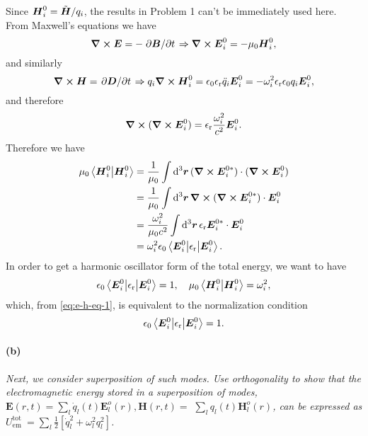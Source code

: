\documentclass[hyperref, a4paper]{article}
\newcommand{\epsr}{\epsilon_{\text{r}}}
\newcommand*{\mvb}[1]{\tilde{\vb*{#1}}}
\begin{document}
Since $\vb*{H}_i^0 = \mvb{H} / q_i$, the results in Problem 1 can't be immediately used here. 
From Maxwell's equations we have 
\[
    \curl{\vb*{E}} = - \pdv*{\vb*{B}}{t} \Rightarrow 
    \curl{\vb*{E}_i^0} = - \mu_0 \vb*{H}_i^0, 
\]
and similarly 
\[
    \curl{\vb*{H}} = \pdv*{\vb*{D}}{t} \Rightarrow
    q_i \curl{\vb*{H}_i^0} = \epsilon_0 \epsr \ddot{q}_i \vb*{E}_i^0 
    = - \omega_i^2 \epsr \epsilon_0 q_i \vb*{E}_i^0,
\]
and therefore 
\[
    \curl{(\curl{\vb*{E}_i^0})} = \epsr \frac{\omega_i^2}{c^2} \vb*{E}_i^0.
\]
Therefore we have 
\begin{equation}
    \begin{aligned}
        \mu_0 \braket{\vb*{H}_i^0}{\vb*{H}_i^0} 
        &= \frac{1}{\mu_0} \int \dd[3]{\vb*{r}} (\curl{\vb*{E}_i^{0*}}) \cdot (\curl{\vb*{E}_i^0}) \\
        &= \frac{1}{\mu_0} \int \dd[3]{\vb*{r}} \curl{(\curl{\vb*{E}_i^{0*}})} \cdot \vb*{E}_i^0 \\
        &= \frac{\omega_i^2}{\mu_0 c^2} \int \dd[3]{\vb*{r}} \epsr \vb*{E}_i^{0*} \cdot \vb*{E}_i^0 \\
        &= \omega_i^2 \epsilon_0 \mel**{\vb*{E}_i^0}{\epsr}{\vb*{E}_i^0}.
    \end{aligned}
    \label{eq:e-h-eq-1}
\end{equation}
In order to get a harmonic oscillator form of the total energy, 
we want to have 
\begin{equation}
    \epsilon_0 \mel**{\vb*{E}_i^0}{\epsr}{\vb*{E}_i^0} = 1, \quad 
    \mu_0 \braket{\vb*{H}_i^0}{\vb*{H}_i^0} = \omega_i^2, 
\end{equation}
which, from \eqref{eq:e-h-eq-1}, is equivalent to the normalization condition 
\begin{equation}
    \epsilon_0 \mel**{\vb*{E}_i^0}{\epsr}{\vb*{E}_i^0} = 1.
\end{equation} 

\paragraph*{(b)} \textit{Next, we consider superposition of such modes. Use orthogonality to show that the electromagnetic energy stored in a superposition of modes, $\mathbf{E}(r, t)=\sum_l \dot{q}_l(t) \mathbf{E}_l^o(r), \mathbf{H}(r, t)=$ $\sum_l q_l(t) \mathbf{H}_l^o(r)$, can be expressed as $U_{\text {em }}^{\text {tot }}=\sum_l \frac{1}{2}\left[\dot{q}_l^2+\omega_l^2 q_l^2\right]$.}
\end{document}
